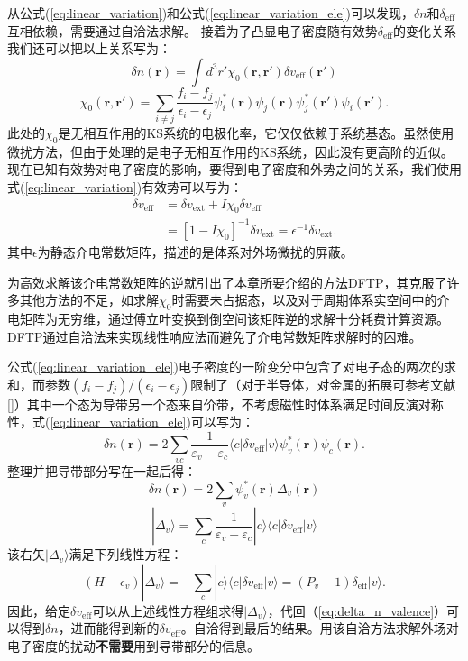 从公式(\ref{eq:linear_variation})和公式(\ref{eq:linear_variation_ele})可以发现，$\delta n$和$\delta_\mathrm{eff}$互相依赖，需要通过自洽法求解。
接着为了凸显电子密度随有效势$\delta_\mathrm{eff}$的变化关系我们还可以把以上关系写为：
\begin{equation}
  \delta n(\bm{r}) = \int d^3 r' \chi_0 (\bm{r},\bm{r'})\delta v_\mathrm{eff}(\bm{r'})
\end{equation}
\begin{equation}
  \chi_0(\bm{r},\bm{r'}) = \sum_{i\neq j}\frac{f_i-f_j}{\epsilon_i-\epsilon_j} \psi^*_i(\bm{r})\psi_j(\bm{r})\psi^*_j(\bm{r'})\psi_i(\bm{r'}).
\end{equation}
此处的$\chi_0$是无相互作用的KS系统的电极化率，它仅仅依赖于系统基态。虽然使用微扰方法，但由于处理的是电子无相互作用的KS系统，因此没有更高阶的近似。
现在已知有效势对电子密度的影响，要得到电子密度和外势之间的关系，我们使用式(\ref{eq:linear_variation})有效势可以写为：
\begin{align}
  \delta v_\mathrm{eff} &= \delta v_\mathrm{ext} + I \chi_0 \delta v_\mathrm{eff} \\
  &= [1-I\chi_0]^{-1} \delta v_\mathrm{ext} = \epsilon^{-1} \delta v_\mathrm{ext}.
\end{align}
其中$\epsilon$为静态介电常数矩阵，描述的是体系对外场微扰的屏蔽。

为高效求解该介电常数矩阵的逆就引出了本章所要介绍的方法DFTP，其克服了许多其他方法的不足，如求解$\chi_0$时需要未占据态，以及对于周期体系实空间中的介电矩阵为无穷维，通过傅立叶变换到倒空间该矩阵逆的求解十分耗费计算资源。DFTP通过自洽法来实现线性响应法而避免了介电常数矩阵求解时的困难。

公式(\ref{eq:linear_variation_ele})电子密度的一阶变分中包含了对电子态的两次的求和，而参数$(f_i-f_j)/(\epsilon_i-\epsilon_j)$限制了（对于半导体，对金属的拓展可参考文献[]）其中一个态为导带另一个态来自价带，不考虑磁性时体系满足时间反演对称性，式(\ref{eq:linear_variation_ele})可以写为：
\begin{equation}
  \delta n(\bm{r}) = 2\sum_{vc}\frac{1}{\varepsilon_v-\varepsilon_c}
  \langle c| \delta v_\mathrm{eff} | v\rangle \psi^*_v(\bm{r})\psi_c(\bm{r}).
\end{equation}
整理并把导带部分写在一起后得：
\begin{equation}\label{eq:delta_n_valence}
  \delta n(\bm{r}) = 2\sum_v \psi^*_v(\bm{r}) \Delta_v(\bm{r})
\end{equation}
\begin{equation}
  |\Delta_v \rangle = \sum_{c}\frac{1}{\varepsilon_v-\varepsilon_c}
  |c\rangle \langle c| \delta v_\mathrm{eff} | v\rangle
\end{equation}
该右矢$|\Delta_v\rangle$满足下列线性方程：
\begin{equation}
  (H-\epsilon_v)|\Delta_v\rangle = -\sum_c |c\rangle \langle c| \delta v_\mathrm{eff} | v\rangle = (P_v-1)\delta_\mathrm{eff}|v\rangle .
\end{equation}
因此，给定$\delta v_\mathrm{eff}$可以从上述线性方程组求得$|\Delta_v\rangle$，代回（\ref{eq:delta_n_valence}）可以得到$\delta n$，进而能得到新的$\delta v_\mathrm{eff}$。自洽得到最后的结果。用该自洽方法求解外场对电子密度的扰动{\textbf{不需要}}用到导带部分的信息。

